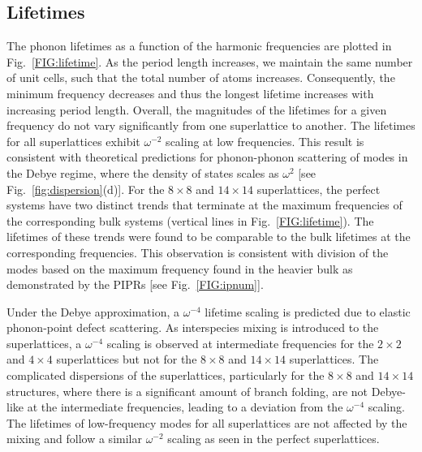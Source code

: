 \documentclass[aps,prb,preprint,preprintnumbers,amsmath,amssymb,floatfix,superscriptaddress]{revtex4}
\newcommand{\kv}{\mspace{-4.0mu}\left(\mspace{-8.0mu}
\begin{smallmatrix}&\pmb{\kappa} \\&\nu\end{smallmatrix}
\mspace{-3.0mu}\right)}
\begin{document}

\subsection{Lifetimes}

The phonon lifetimes as a function of the harmonic frequencies are plotted in Fig.~\ref{FIG:lifetime}. As the period length increases, we maintain the same number of unit cells, such that the total number of atoms increases. Consequently, the minimum frequency decreases and thus the longest lifetime increases with increasing period length. Overall, the magnitudes of the lifetimes for a given frequency do not vary significantly from one superlattice to another. The lifetimes for all superlattices exhibit $\omega^{-2}$ scaling at low frequencies. This result is consistent with theoretical predictions for phonon-phonon scattering of modes in the Debye regime, where the density of states scales as $\omega^{2}$ [see Fig.~\ref{fig:dispersion}(d)].\cite{Klemens_Thermal_1951} For the $8\times8$ and $14\times14$ superlattices, the perfect systems have two distinct trends that terminate at the maximum frequencies of the corresponding bulk systems (vertical lines in Fig.~\ref{FIG:lifetime}). The lifetimes of these trends were found to be comparable to the bulk lifetimes at the corresponding frequencies. This observation is consistent with division of the modes based on the maximum frequency found in the heavier bulk as demonstrated by the PIPRs [see Fig.~\ref{FIG:ipnum}].


Under the Debye approximation, a $\omega^{-4}$ lifetime scaling is predicted due to elastic phonon-point defect scattering.\cite{PhysRev.140.A1812,klemens_scattering_1955-3, klemens_thermal_1957-2} As interspecies mixing is introduced to the superlattices, a $\omega^{-4}$ scaling is observed at intermediate frequencies for the $2\times2$ and $4\times4$ superlattices but not for the $8\times8$ and $14\times14$ superlattices. The complicated dispersions of the superlattices, particularly for the $8\times8$ and $14\times14$ structures, where there is a significant amount of branch folding, are not Debye-like at the intermediate frequencies, leading to a deviation from the $\omega^{-4}$ scaling. The lifetimes of low-frequency modes for all superlattices are not affected by the mixing and follow a similar $\omega^{-2}$ scaling as seen in the perfect superlattices.
\end{document}
